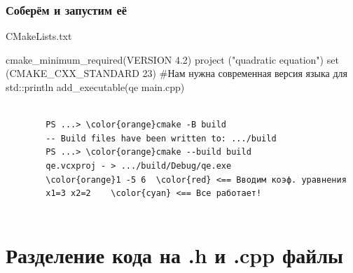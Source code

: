 \documentclass[9pt, aspectratio=1610]{beamer}
\begin{document}
\begin{frame}[fragile]\frametitle{Соберём и запустим её}
	
	\begin{block}{CMakeLists.txt}
		
		\begin{cmakecode} 
			cmake_minimum_required(VERSION 4.2)
			project ("quadratic equation")
			set (CMAKE_CXX_STANDARD 23) #Нам нужна современная версия языка для std::println
			add_executable(qe main.cpp)
		\end{cmakecode}
		
		
	\end{block}
	
	\medskip
	
	\begin{Verbatim}[bgcolor=black,tabsize=4,formatcom=\color{white},gobble=2,fontsize=\small, commandchars=\\\{\}, xleftmargin=0em, frame=single,framerule=0pt ,rulecolor=\color{red},framesep=1em,fillcolor=\color{black}]
		
		PS ...> \color{orange}cmake -B build 
		-- Build files have been written to: .../build
		PS ...> \color{orange}cmake --build build
		qe.vcxproj - > .../build/Debug/qe.exe
		\color{orange}1 -5 6  \color{red} <== Вводим коэф. уравнения
		x1=3 x2=2    \color{cyan} <== Все работает!
		
	\end{Verbatim}
	
\end{frame}



\section[.h и .cpp]{Разделение кода на {\ttfamily .h} и {\ttfamily .cpp} файлы }
\frame{\sectionpage}
\end{document}
